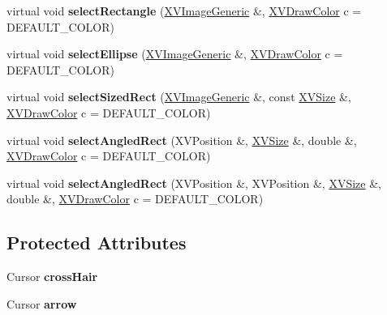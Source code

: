 \begin{CompactItemize}
\item 
\label{XVInteractWindowX_a5}
\hypertarget{class_XVInteractWindowX_a5}{
virtual void {\bf select\-Rectangle} (\hyperlink{class_XVImageGeneric}{XVImage\-Generic} \&, \hyperlink{class_XVDrawColor}{XVDraw\-Color} c = DEFAULT\_\-COLOR)}

\item 
\label{XVInteractWindowX_a6}
\hypertarget{class_XVInteractWindowX_a6}{
virtual void {\bf select\-Ellipse} (\hyperlink{class_XVImageGeneric}{XVImage\-Generic} \&, \hyperlink{class_XVDrawColor}{XVDraw\-Color} c = DEFAULT\_\-COLOR)}

\item 
\label{XVInteractWindowX_a7}
\hypertarget{class_XVInteractWindowX_a7}{
virtual void {\bf select\-Sized\-Rect} (\hyperlink{class_XVImageGeneric}{XVImage\-Generic} \&, const \hyperlink{class_XVSize}{XVSize} \&, \hyperlink{class_XVDrawColor}{XVDraw\-Color} c = DEFAULT\_\-COLOR)}

\item 
\label{XVInteractWindowX_a8}
\hypertarget{class_XVInteractWindowX_a8}{
virtual void {\bf select\-Angled\-Rect} (XVPosition \&, \hyperlink{class_XVSize}{XVSize} \&, double \&, \hyperlink{class_XVDrawColor}{XVDraw\-Color} c = DEFAULT\_\-COLOR)}

\item 
\label{XVInteractWindowX_a9}
\hypertarget{class_XVInteractWindowX_a9}{
virtual void {\bf select\-Angled\-Rect} (XVPosition \&, XVPosition \&, \hyperlink{class_XVSize}{XVSize} \&, double \&, \hyperlink{class_XVDrawColor}{XVDraw\-Color} c = DEFAULT\_\-COLOR)}

\end{CompactItemize}
\subsection*{Protected Attributes}
\begin{CompactItemize}
\item 
Cursor {\bf cross\-Hair}
\item 
Cursor {\bf arrow}
\end{CompactItemize}


